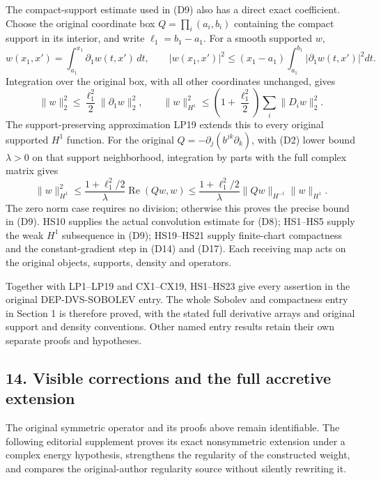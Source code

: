 \documentclass[
  11pt,
]{article}
\begin{document}
The compact-support estimate used in (D9) also has a direct exact
coefficient. Choose the original coordinate box \(Q=\prod_i(a_i,b_i)\)
containing the compact support in its interior, and write
\(\ell_1=b_1-a_1\). For a smooth supported \(w\), \[
 w(x_1,x')=\int_{a_1}^{x_1}\partial_1w(t,x')\,dt,\qquad
 |w(x_1,x')|^2\leq(x_1-a_1)
                   \int_{a_1}^{b_1}|\partial_1 w(t,x')|^2dt .
\] Integration over the original box, with all other coordinates
unchanged, gives \[
 \|w\|_2^2\leq\frac{\ell_1^2}{2}\|\partial_1w\|_2^2,\qquad
 \|w\|_{H^1}^2
     \leq\left(1+\frac{\ell_1^2}{2}\right)
                                  \sum_i\|D_iw\|_2^2 .         \tag{HS22}
\] The support-preserving approximation LP19 extends this to every
original supported \(H^1\) function. For the original
\(Q=-\partial_j(b^{jk}\partial_k)\), with (D2) lower bound \(\lambda>0\)
on that support neighborhood, integration by parts with the full complex
matrix gives \[
 \|w\|_{H^1}^2
 \leq \frac{1+\ell_1^2/2}{\lambda}
                  \operatorname{Re}(Qw,w)
 \leq \frac{1+\ell_1^2/2}{\lambda}
                    \|Qw\|_{H^{-1}}\|w\|_{H^1}.               \tag{HS23}
\] The zero norm case requires no division; otherwise this proves the
precise bound in (D9). HS10 supplies the actual convolution estimate for
(D8); HS1--HS5 supply the weak \(H^1\) subsequence in (D9); HS19--HS21
supply finite-chart compactness and the constant-gradient step in (D14)
and (D17). Each receiving map acts on the original objects, supports,
density and operators.

Together with LP1--LP19 and CX1--CX19, HS1--HS23 give every assertion in
the original DEP-DVS-SOBOLEV entry. The whole Sobolev and compactness
entry in Section 1 is therefore proved, with the stated full derivative
arrays and original support and density conventions. Other named entry
results retain their own separate proofs and hypotheses.

\subsection{14. Visible corrections and the full accretive
extension}\label{visible-corrections-and-the-full-accretive-extension}

The original symmetric operator and its proofs above remain
identifiable. The following editorial supplement proves its exact
nonsymmetric extension under a complex energy hypothesis, strengthens
the regularity of the constructed weight, and compares the
original-author regularity source without silently rewriting it.
\end{document}
